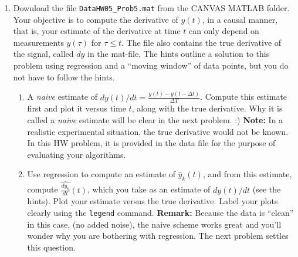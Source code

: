 \documentclass[letterpaper]{article}
\begin{document}
\begin{enumerate}
\begin{enumerate}
\item Either look up a proof of the following fact and copy it down, or develop your own proof: Suppose that $A$, $B$, $C$ and $D$ are compatible\footnote{The sizes are such the matrix products and sum in $A+BCD$ make sense.} matrices. If $A$, $C$, and  $(C^{-1}+D A^{-1}B)$ are each square and invertible, then  $A+BCD$ is invertible and
    $$ (A + BCD)^{-1} = A^{-1} - A^{-1}B(C^{-1} + DA^{-1}B)^{-1}DA^{-1}$$

    \item In many important applications, the inverse of $A$ may be already known or easy to compute. Here is a made up example, but it gets the point across: By hand, evaluate $ (A + BCD)^{-1}$ when
        $$A=\mathrm{diag}([1,~0.5, ~0.5,~1,~ 0.5]), ~ B=\begin{bmatrix} 1 \\ 0\\ 2\\ 0 \\3 \end{bmatrix}, C=0.2, D= B^\top $$


\end{enumerate}

\item Download the file \texttt{DataHW05\_Prob5.mat} from the CANVAS MATLAB folder. Your objective is to compute the derivative of $y(t)$, in a causal manner, that is, your estimate of the derivative at time $t$ can only depend on measurements $y(\tau)$ for $\tau \le t$. The file also contains the true derivative of the signal, called $dy$ in the mat-file. The hints outline a solution to this problem using regression and a ``moving window'' of data points, but you do not have to follow the hints.

    \begin{enumerate}
\setlength{\itemsep}{.1in}
\renewcommand{\labelenumi}{(\alph{enumi})}

\item A \textit{naive} estimate of $dy(t)/dt = \frac{y(t) - y(t-\Delta t)}{\Delta T}$. Compute this estimate first and plot it versus time $t$, along with the true derivative. Why it is called a \textit{naive} estimate will be clear in the next problem. :) \textbf{Note:} In a realistic experimental situation, the true derivative would not be known. In this HW problem, it is provided in the data file for the purpose of evaluating your algorithms.

    \item Use regression to compute an estimate of $ \hat{y}_k(t)$, and from this estimate, compute $ \widehat{\frac{dy_k}{dt}}(t)$, which you take as an estimate of $dy(t)/dt$ (see the hints). Plot your estimate versus the true derivative. Label your plots clearly using the \texttt{legend} command.   \textbf{Remark:} Because the data is ``clean'' in this case, (no added noise), the naive scheme works great and you'll wonder why you are bothering with regression. The next problem settles this question.


\end{enumerate}
\end{enumerate}
\end{document}
